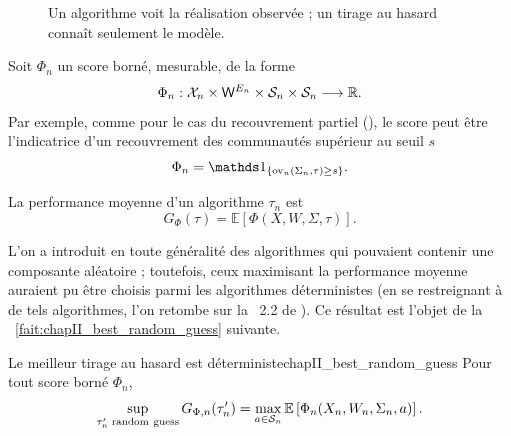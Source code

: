 \begin{figure}[H]
\centering
{}
\caption{Un algorithme voit la réalisation observée ; un tirage au hasard connaît seulement le modèle. }
\label{fig:chapII_algo_vs_guess}
\end{figure}


Soit $\Phi_n$ un score borné, mesurable, de la forme
\[
    \Phi_n:\mathcal X_n\times \mathsf W^{E_n}\times\mathcal S_n\times\mathcal S_n\longrightarrow\mathbb R.
\]
Par exemple, comme pour le cas du recouvrement partiel (), le score peut être l'indicatrice d'un recouvrement des communautés supérieur au seuil $s$
\[
\Phi_n = \ind{\ov_n(\Sigma_n,\tau)\ge s}.
\]

La performance moyenne d'un algorithme $\tau_n$ est
\begin{equation}
    G_{\Phi}(\tau)
    =
    \mathbb E\left[\Phi(X,W,\Sigma,\tau)\right].
    \label{eq:chapII_score_general}
\end{equation}

L'on a introduit en toute généralité des algorithmes qui pouvaient contenir une composante aléatoire ; toutefois, ceux maximisant la performance moyenne auraient pu être choisis parmi les algorithmes déterministes (en se restreignant à de tels algorithmes, l'on retombe sur la \Def~2.2 de \SB{} \cite{SankararamanBaccelli2018}).
Ce résultat est l'objet de la \Fact~\ref{fait:chapII_best_random_guess} suivante.

\begin{Fait}{Le meilleur tirage au hasard est déterministe}{chapII_best_random_guess}
Pour tout score borné $\Phi_n$,
\begin{equation}
    \sup_{\tau_n'\;\mathrm{random\ guess}}G_{\Phi,n}(\tau_n')
    =
    \max_{a\in\Conf_n}
    \mathbb E\left[\Phi_n(X_n,W_n,\Sigma_n,a)\right].
    \label{eq:chapII_best_guess_deterministe}
\end{equation}

\end{Fait}

